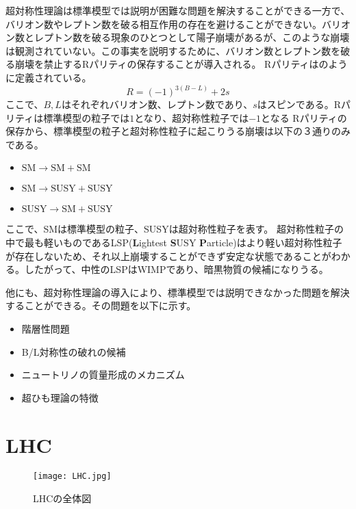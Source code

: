 超対称性理論は標準模型では説明が困難な問題を解決することができる一方で、バリオン数やレプトン数を破る相互作用の存在を避けることができない。バリオン数とレプトン数を破る現象のひとつとして陽子崩壊があるが、このような崩壊は観測されていない。この事実を説明するために、バリオン数とレプトン数を破る崩壊を禁止するRパリティの保存することが導入される。
Rパリティはのように定義されている。
\begin{equation}
  \label{eq:r}
  R = (-1)^{3(B-L)}+2s
\end{equation}
ここで、$B, L$はそれぞれバリオン数、レプトン数であり、$s$はスピンである。Rパリティは標準模型の粒子では$1$となり、超対称性粒子では$-1$となる
Rパリティの保存から、標準模型の粒子と超対称性粒子に起こりうる崩壊は以下の３通りのみである。
\begin{itemize}
  \item $\mathrm{SM} \to \mathrm{SM} + \mathrm{SM}$
  \item $\mathrm{SM} \to \mathrm{SUSY} + \mathrm{SUSY}$
  \item $\mathrm{SUSY} \to \mathrm{SM} + \mathrm{SUSY}$
\end{itemize}
ここで、SMは標準模型の粒子、SUSYは超対称性粒子を表す。
超対称性粒子の中で最も軽いものであるLSP(\textbf{L}ightest \textbf{S}USY \textbf{P}article)はより軽い超対称性粒子が存在しないため、それ以上崩壊することができず安定な状態であることがわかる。したがって、中性のLSPはWIMPであり、暗黒物質の候補になりうる。



他にも、超対称性理論の導入により、標準模型では説明できなかった問題を解決することができる。その問題を以下に示す。
\begin{itemize}
  \item 階層性問題
  \item B/L対称性の破れの候補
  \item ニュートリノの質量形成のメカニズム
  \item 超ひも理論の特徴
\end{itemize}


\section{LHC}
\label{sec:LHC}
\begin{figure}[tbp]
  \centering
  \texttt{[image: LHC.jpg]}
  \caption[LHCの全体図]{LHCの全体図 \cite{LHC} }
  \label{fig:LHC}
\end{figure}

